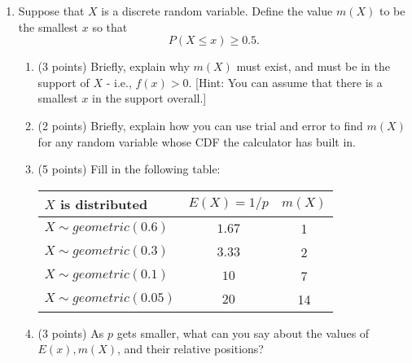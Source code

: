 \documentclass[11pt]{article}
\newenvironment{solution}
  {\textit{Solution.}}
\newcommand{\sol}[1]{
    \begin{customframedproof}[linecolor=orangehdx!75,]
        \begin{solution}
        #1
        \end{solution}
    \end{customframedproof}
}
\begin{document}
\begin{enumerate}
    \item Suppose that \(X\) is a discrete random variable. Define the value \(m(X)\) to be the smallest \(x\) so that 
    \[
        P(X \leq x) \geq 0.5.
    \]
    \begin{enumerate}
        \item (3 points) Briefly, explain why \(m(X)\) must exist, and must be in the support of \(X\) - i.e., \(f(x) > 0\). [Hint: You can assume that there is a smallest \(x\) in the support overall.]
        \item (2 points) Briefly, explain how you can use trial and error to find \(m(X)\) for any random variable whose CDF the calculator has built in.

        \item (5 points) Fill in the following table:
        \begin{center}
            \begin{tabular}[htbp]{|l||c|c|}
                \hline
                \(X\) is distributed & \(E(X) = 1/p\) & \(m(X)\) \\ \hline
                \(X \sim geometric(0.6)\) & \(1.67\) & 1 \\ \hline
                \(X \sim geometric(0.3)\) & \(3.33\) & 2 \\ \hline
                \(X \sim geometric(0.1)\) & \(10\) & 7 \\ \hline
                \(X \sim geometric(0.05)\) & \(20\) & 14 \\ \hline
            \end{tabular}
        \end{center}
        \item (3 points) As \(p\) gets smaller, what can you say about the values of \(E(x), m(X)\), and their relative positions?
    \end{enumerate}


\end{enumerate}
\end{document}

